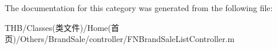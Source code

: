 The documentation for this category was generated from the following file\+:\begin{DoxyCompactItemize}
\item 
T\+H\+B/\+Classes(类文件)/\+Home(首页)/\+Others/\+Brand\+Sale/controller/F\+N\+Brand\+Sale\+List\+Controller.\+m\end{DoxyCompactItemize}
